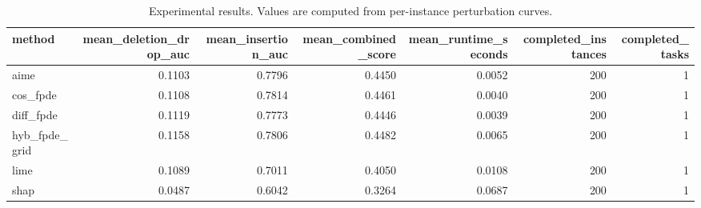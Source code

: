 \begin{table}[t]
\caption{Experimental results. Values are computed from per-instance perturbation curves.}
\label{tab:main_results_computed}
\centering
\begin{tabular}{lrrrrrr}
\toprule
method & mean\_deletion\_drop\_auc & mean\_insertion\_auc & mean\_combined\_score & mean\_runtime\_seconds & completed\_instances & completed\_tasks \\
\midrule
aime & 0.1103 & 0.7796 & 0.4450 & 0.0052 & 200 & 1 \\
cos\_fpde & 0.1108 & 0.7814 & 0.4461 & 0.0040 & 200 & 1 \\
diff\_fpde & 0.1119 & 0.7773 & 0.4446 & 0.0039 & 200 & 1 \\
hyb\_fpde\_grid & 0.1158 & 0.7806 & 0.4482 & 0.0065 & 200 & 1 \\
lime & 0.1089 & 0.7011 & 0.4050 & 0.0108 & 200 & 1 \\
shap & 0.0487 & 0.6042 & 0.3264 & 0.0687 & 200 & 1 \\
\bottomrule
\end{tabular}

\end{table}
